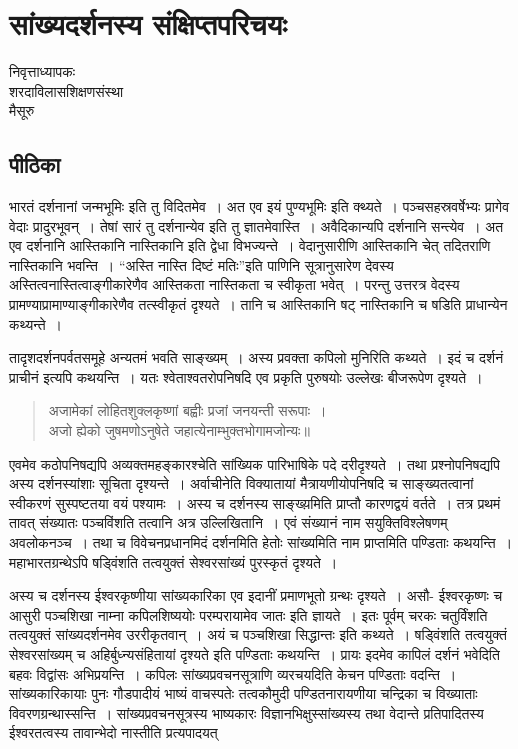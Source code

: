 {\fontsize{15}{17}\selectfont
\chapter{सांख्यदर्शनस्य संक्षिप्तपरिचयः}

\begin{center}
\smallskip

निवृत्ताध्यापकः\\
शरदाविलासशिक्षणसंस्था\\
मैसूरु
\addrule
\end{center}

\section*{पीठिका}

भारतं दर्शनानां जन्मभूमिः इति तु विदितमेव~। अत एव इयं पुण्यभूमिः इति क्थ्यते~। पञ्चसहस्रवर्षेभ्यः प्रागेव वेदाः प्रादुरभूवन्~। तेषां सारं तु दर्शनान्येव इति तु ज्ञातमेवास्ति~। अवैदिकान्यपि दर्शनानि सन्त्येव~। अत एव दर्शनानि आस्तिकानि नास्तिकानि इति द्वेधा विभज्यन्ते~। वेदानुसारीणि आस्तिकानि चेत् तदितराणि नास्तिकानि भवन्ति~। “अस्ति नास्ति दिष्टं मतिः”इति पाणिनि सूत्रानुसारेण देवस्य अस्तित्वनास्तित्वाङ्गीकारेणैव आस्तिकता नास्तिकता च स्वीकृता भवेत्~। परन्तु उत्तरत्र वेदस्य प्रामण्याप्रामाण्याङ्गीकारेणैव तत्स्वीकृतं दृश्यते~। तानि च आस्तिकानि षट् नास्तिकानि च षडिति प्राधान्येन कथ्यन्ते~। 

तादृशदर्शनपर्वतसमूहे अन्यतमं भवति साङ्ख्यम्~। अस्य प्रवक्ता कपिलो मुनिरिति कथ्यते~। इदं च दर्शनं प्राचीनं इत्यपि कथयन्ति~। यतः श्वेताश्वतरोपनिषदि एव प्रकृति पुरुषयोः उल्लेखः बीजरूपेण दृश्यते~। 
\begin{verse}
अजामेकां लोहितशुक्लकृष्णां बह्वीः प्रजां जनयन्ती सरूपाः~। \\
अजो ह्येको जुषमणोऽनुषेते जहात्येनाम्भुक्तभोगामजोन्यः॥
\end{verse}
एवमेव कठोपनिषद्यपि अव्यक्तमहङ्कारश्चेति सांख्यिक पारिभाषिके पदे दरीदृश्यते~। तथा प्रश्नोपनिषद्यपि अस्य दर्शनस्यांशाः सूचिता दृश्यन्ते~। अर्वाचीनेति विक्यातायां मैत्रायणीयोपनिषदि च साङ्ख्यतत्वानां स्वीकरणं सुस्पष्टतया वयं पश्यामः~। अस्य च दर्शनस्य साङ्ख्य़मिति प्राप्तौ कारणद्वयं वर्तते~। तत्र प्रथमं तावत् संख्यातः पञ्चविंशति तत्वानि अत्र उल्लिखितानि~। एवं संख्यानं नाम सयुक्तिविश्लेषणम् अवलोकनञ्च~। तथा च विवेचनप्रधानमिदं दर्शनमिति हेतोः सांख्यमिति नाम प्राप्तमिति पण्डिताः कथयन्ति~। महाभारतग्रन्थेऽपि षड्विंशति तत्वयुक्तं सेश्वरसांख्यं पुरस्कृतं दृश्यते~। 

अस्य च दर्शनस्य ईश्वरकृष्णीया सांख्यकारिका एव इदानीं प्रमाणभूतो ग्रन्थः दृश्यते~। असौ- ईश्वरकृष्णः च आसुरी पञ्चशिखा नाम्ना कपिलशिष्ययोः परम्परायामेव जातः इति ज्ञायते~। इतः पूर्वम् चरकः चतुर्विंशति तत्वयुक्तं सांख्यदर्शनमेव उररीकृतवान्~। अयं च पञ्चशिखा सिद्धान्तः इति कथ्यते~। षड्विंशति तत्वयुक्तं सेश्वरसांख्यम् च अहिर्बुध्न्यसंहितायां दृश्यते इति पण्डिताः कथयन्ति~। प्रायः इदमेव कापिलं दर्शनं भवेदिति बहवः विद्वांसः अभिप्रयन्ति~। कपिलः सांख्यप्रवचनसूत्राणि व्यरचयदिति केचन पण्डिताः वदन्ति~। सांख्यकारिकायाः पुनः गौडपादीयं भाष्यं वाचस्पतेः तत्वकौमुदी पण्डितनारायणीया चन्द्रिका च विख्याताः विवरणग्रन्थास्सन्ति~। सांख्यप्रवचनसूत्रस्य भाष्यकारः विज्ञानभिक्षुस्सांख्यस्य तथा वेदान्ते प्रतिपादितस्य ईश्वरतत्वस्य तावान्भेदो नास्तीति प्रत्यपादयत् 

}
